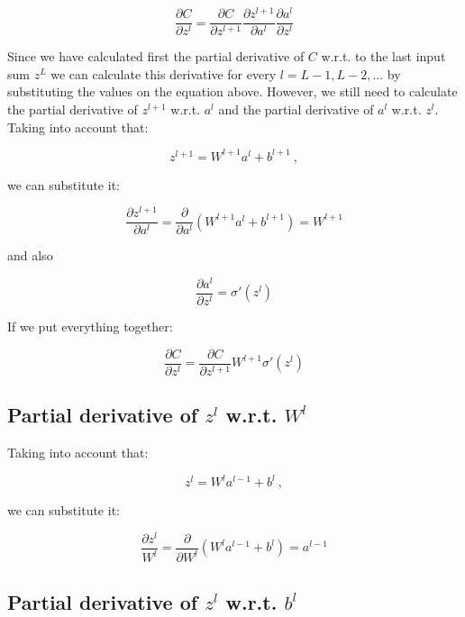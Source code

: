 \documentclass{article}
\begin{document}
\begin{equation}
\frac{\partial C}{\partial z^l} = \frac{\partial C}{\partial z^{l+1}}\frac{\partial z^{l+1}}{\partial a^l}\frac{\partial a^l}{\partial z^l}
\end{equation}

Since we have calculated first the partial derivative of $C$ w.r.t. to the last input sum $z^L$ we can calculate this derivative for every $l = L-1, L-2, ...$ by substituting the values on the equation above. However, we still need to calculate the partial derivative of $z^{l+1}$ w.r.t. $a^l$ and the partial derivative of $a^l$ w.r.t. $z^l$. Taking into account that:

\begin{equation}
z^{l+1} = W^{l+1}a^l + b^{l+1}~,
\end{equation}

we can substitute it:

\begin{equation}
\frac{\partial z^{l+1}}{\partial a^l} = \frac{\partial}{\partial a^l}(W^{l+1}a^l + b^{l+1}) = W^{l+1}
\end{equation}

and also

\begin{equation}
\frac{\partial a^l}{\partial z^l} = \sigma'(z^l)
\end{equation}

If we put everything together:

\begin{equation}
\frac{\partial C}{\partial z^l} = \frac{\partial C}{\partial z^{l+1}}W^{l+1}\sigma'(z^l)
\end{equation}

\subsection{Partial derivative of $z^l$ w.r.t. $W^l$}

Taking into account that:

\begin{equation}
z^{l} = W^{l}a^{l-1} + b^{l}~,
\end{equation}

we can substitute it:

\begin{equation}
\frac{\partial z^l}{W^l} = \frac{\partial}{\partial W^l}(W^{l}a^{l-1} + b^{l}) = a^{l-1}
\end{equation}

\subsection{Partial derivative of $z^l$ w.r.t. $b^l$}
\end{document}
